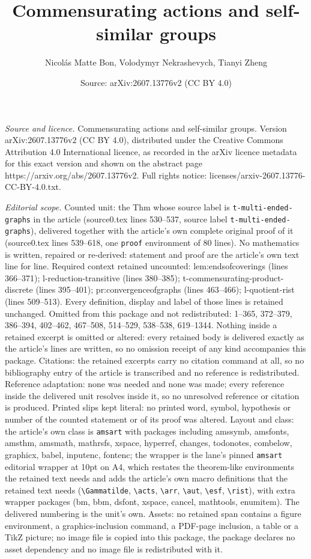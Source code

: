 \documentclass[10pt,a4paper]{amsart}
\title[Commensurating actions and self-similar groups]{Commensurating actions and self-similar groups}
\author{Nicol\'as Matte Bon, Volodymyr Nekrashevych, Tianyi Zheng}
\date{Source: arXiv:2607.13776v2 (CC BY 4.0)}
\begin{document}
\maketitle

\noindent\emph{Source and licence.} Commensurating actions and self-similar groups. Version arXiv:2607.13776v2 (CC BY 4.0), distributed under the Creative Commons Attribution 4.0 International licence, as recorded in the arXiv licence metadata for this exact version and shown on the abstract page https://arxiv.org/abs/2607.13776v2. Full rights notice: licenses/arxiv-2607.13776-CC-BY-4.0.txt.\par\smallskip

\noindent\textit{Editorial scope.} Counted unit: the Thm whose source label is \texttt{t-multi-ended-graphs} in the article (source0.tex lines 530--537, source label \texttt{t-multi-ended-graphs}), delivered together with the article's own complete original proof of it (source0.tex lines 539--618, one \texttt{proof} environment of 80 lines). No mathematics is written, repaired or re-derived: statement and proof are the article's own text line for line. Required context retained uncounted: lem:endsofcoverings (lines 366--371); l-reduction-transitive (lines 380--385); t-commensurating-product-discrete (lines 395--401); pr:convergenceofgraphs (lines 463--466); l-quotient-rist (lines 509--513). Every definition, display and label of those lines is retained unchanged. Omitted from this package and not redistributed: 1--365, 372--379, 386--394, 402--462, 467--508, 514--529, 538--538, 619--1344. Nothing inside a retained excerpt is omitted or altered: every retained body is delivered exactly as the article's lines are written, so no omission receipt of any kind accompanies this package. Citations: the retained excerpts carry no citation command at all, so no bibliography entry of the article is transcribed and no reference is redistributed. Reference adaptation: none was needed and none was made; every reference inside the delivered unit resolves inside it, so no unresolved reference or citation is produced. Printed slips kept literal: no printed word, symbol, hypothesis or number of the counted statement or of its proof was altered. Layout and class: the article's own class is \texttt{amsart} with packages including amssymb, amsfonts, amsthm, amsmath, mathrsfs, xspace, hyperref, changes, todonotes, combelow, graphicx, babel, inputenc, fontenc; the wrapper is the lane's pinned \texttt{amsart} editorial wrapper at 10pt on A4, which restates the theorem-like environments the retained text needs and adds the article's own macro definitions that the retained text needs (\texttt{\textbackslash Gammatilde}, \texttt{\textbackslash acts}, \texttt{\textbackslash arr}, \texttt{\textbackslash aut}, \texttt{\textbackslash esf}, \texttt{\textbackslash rist}), with extra wrapper packages (bm, bbm, dsfont, xspace, cancel, mathtools, enumitem). The delivered numbering is the unit's own. Assets: no retained span contains a figure environment, a graphics-inclusion command, a PDF-page inclusion, a table or a TikZ picture; no image file is copied into this package, the package declares no asset dependency and no image file is redistributed with it. 
\end{document}
